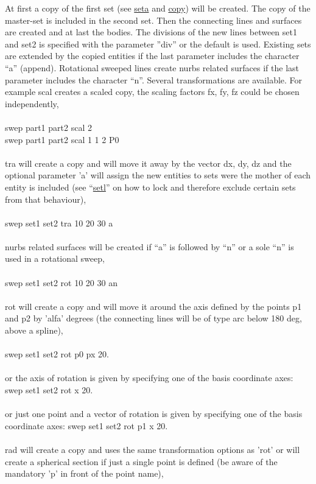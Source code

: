 \documentclass{article}
\providecommand{\htmlref}[2]{\hyperref[#2]{#1}}
\begin{document}
At first a copy of the first set (see \htmlref{seta}{seta} and \htmlref{copy}{copy}) will be created. The copy of the master-set is included in the second set. Then the connecting lines and surfaces are created and at last the bodies. The divisions of the new lines between set1 and set2 is specified with the parameter ''div'' or the default is used. Existing sets are extended by the copied entities if the last parameter includes the character ``a'' (append). Rotational sweeped lines create nurbs related surfaces if the last parameter includes the character ``n''. Several transformations are available. For example scal creates a scaled copy, the scaling factors fx, fy, fz could be chosen independently,\\\\
swep part1 part2 scal 2 \\
swep part1 part2 scal 1 1 2 P0\\\\
tra will create a copy and will move it away by the vector dx, dy, dz and the optional parameter 'a' will assign the new entities to sets were the mother of each entity is included (see ``\htmlref{setl}{setl}'' on how to lock and therefore exclude certain sets from that behaviour),\\\\
swep set1 set2 tra 10 20 30 a\\\\
nurbs related surfaces will be created if ``a'' is followed by ``n'' or a sole ``n'' is used in a rotational sweep,\\\\ 
swep set1 set2 rot 10 20 30 an\\\\
rot will create a copy and will move it around the axis defined by the points p1 and p2 by 'alfa' degrees (the connecting lines will be of type arc below 180 deg, above a spline),\\\\
swep set1 set2 rot p0 px 20.\\\\
or the axis of rotation is given by specifying one of the basis coordinate axes:
swep set1 set2 rot x 20.\\\\
or just one point and a vector of rotation is given by specifying one of the basis coordinate axes:
swep set1 set2 rot p1 x 20.\\\\
rad will create a copy and uses the same transformation options as 'rot' or will create a spherical section if just a single point is defined (be aware of the mandatory 'p' in front of the point name),\\\\
\end{document}
